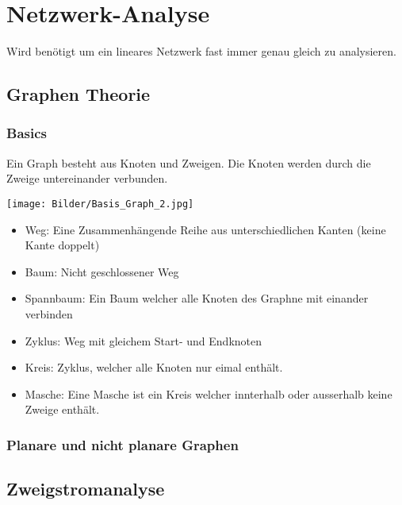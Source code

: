 \documentclass{article}
\begin{document}
\section{Netzwerk-Analyse}
Wird benötigt um ein lineares Netzwerk fast immer genau gleich zu analysieren.

\subsection{Graphen Theorie}
\subsubsection{Basics}
Ein Graph besteht aus Knoten und Zweigen. Die Knoten werden durch die Zweige untereinander verbunden. \\
\begin{center}
    \texttt{[image: Bilder/Basis\_Graph\_2.jpg]}
\end{center}

\begin{itemize}
    \item Weg: Eine Zusammenhängende Reihe aus unterschiedlichen Kanten (keine Kante doppelt)
    \item Baum: Nicht geschlossener Weg
    \item Spannbaum: Ein Baum welcher alle Knoten des Graphne mit einander verbinden
    \item Zyklus: Weg mit gleichem Start- und Endknoten
    \item Kreis: Zyklus, welcher alle Knoten nur eimal enthält.
    \item Masche: Eine Masche ist ein Kreis welcher innterhalb oder ausserhalb keine Zweige enthält.
\end{itemize}
\subsubsection{Planare und nicht planare Graphen}
\subsection{Zweigstromanalyse}
\end{document}
